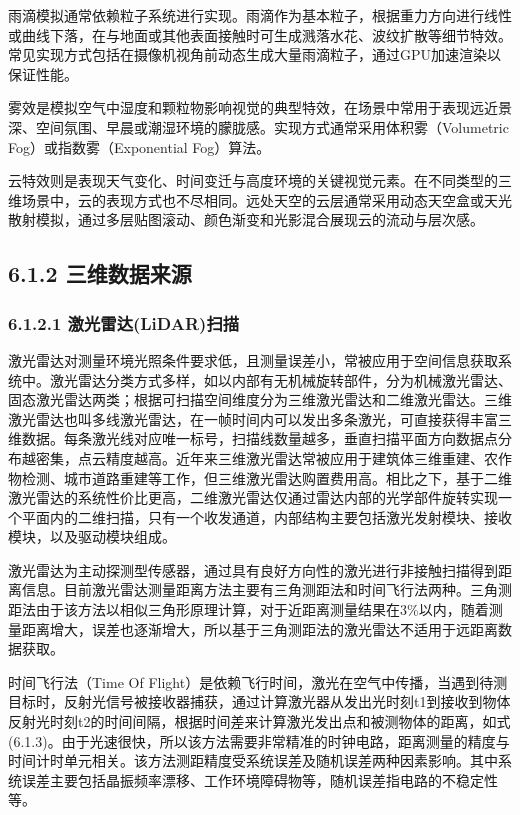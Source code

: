 雨滴模拟通常依赖粒子系统进行实现。雨滴作为基本粒子，根据重力方向进行线性或曲线下落，在与地面或其他表面接触时可生成溅落水花、波纹扩散等细节特效。常见实现方式包括在摄像机视角前动态生成大量雨滴粒子，通过GPU加速渲染以保证性能。

雾效是模拟空气中湿度和颗粒物影响视觉的典型特效，在场景中常用于表现远近景深、空间氛围、早晨或潮湿环境的朦胧感。实现方式通常采用体积雾（Volumetric
Fog）或指数雾（Exponential Fog）算法。

云特效则是表现天气变化、时间变迁与高度环境的关键视觉元素。在不同类型的三维场景中，云的表现方式也不尽相同。远处天空的云层通常采用动态天空盒或天光散射模拟，通过多层贴图滚动、颜色渐变和光影混合展现云的流动与层次感。

\subsection{6.1.2
三维数据来源}\label{ux4e09ux7ef4ux6570ux636eux6765ux6e90}

\subsubsection{6.1.2.1
激光雷达(LiDAR)扫描}\label{ux6fc0ux5149ux96f7ux8fbelidarux626bux63cf}

激光雷达对测量环境光照条件要求低，且测量误差小，常被应用于空间信息获取系统中。激光雷达分类方式多样，如以内部有无机械旋转部件，分为机械激光雷达、固态激光雷达两类；根据可扫描空间维度分为三维激光雷达和二维激光雷达。三维激光雷达也叫多线激光雷达，在一帧时间内可以发出多条激光，可直接获得丰富三维数据。每条激光线对应唯一标号，扫描线数量越多，垂直扫描平面方向数据点分布越密集，点云精度越高。近年来三维激光雷达常被应用于建筑体三维重建、农作物检测、城市道路重建等工作，但三维激光雷达购置费用高。相比之下，基于二维激光雷达的系统性价比更高，二维激光雷达仅通过雷达内部的光学部件旋转实现一个平面内的二维扫描，只有一个收发通道，内部结构主要包括激光发射模块、接收模块，以及驱动模块组成。

激光雷达为主动探测型传感器，通过具有良好方向性的激光进行非接触扫描得到距离信息。目前激光雷达测量距离方法主要有三角测距法和时间飞行法两种。三角测距法由于该方法以相似三角形原理计算，对于近距离测量结果在3\%以内，随着测量距离增大，误差也逐渐增大，所以基于三角测距法的激光雷达不适用于远距离数据获取。

时间飞行法（Time Of
Flight）是依赖飞行时间，激光在空气中传播，当遇到待测目标时，反射光信号被接收器捕获，通过计算激光器从发出光时刻t1到接收到物体反射光时刻t2的时间间隔，根据时间差来计算激光发出点和被测物体的距离，如式(6.1.3)。由于光速很快，所以该方法需要非常精准的时钟电路，距离测量的精度与时间计时单元相关。该方法测距精度受系统误差及随机误差两种因素影响。其中系统误差主要包括晶振频率漂移、工作环境障碍物等，随机误差指电路的不稳定性等。

